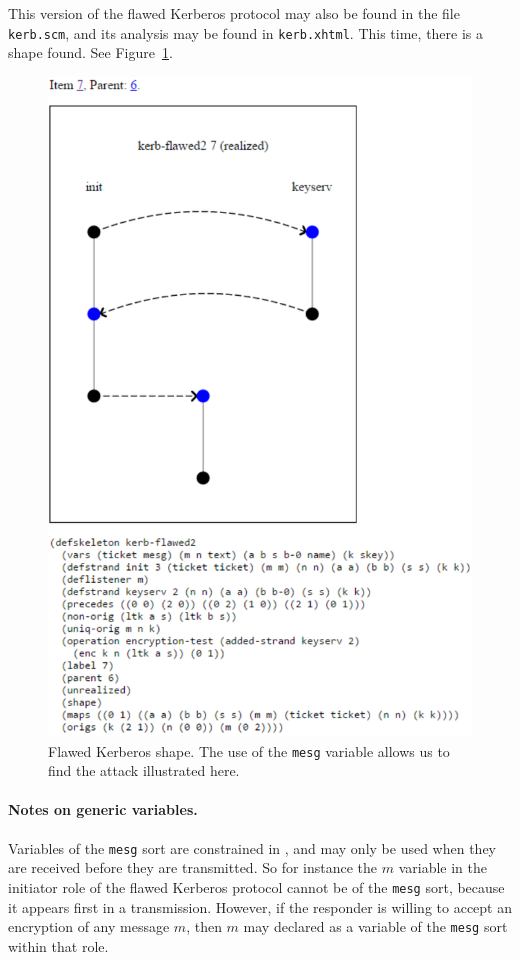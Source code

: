 This version of the flawed Kerberos protocol may also be found in the
file \texttt{kerb.scm}, and its analysis may be found in
\texttt{kerb.xhtml}.  This time, there is a shape found.  See
Figure~\ref{fig:kerb-skel7}.

\begin{figure}
\centering
\includegraphics[scale=0.8]{kerb_skel7}
\caption[Flawed Kerberos shape]{Flawed Kerberos shape.  The use of the \texttt{mesg} variable allows us to find the attack illustrated here.}
\label{fig:kerb-skel7}
\end{figure}

\paragraph{Notes on generic variables.}
Variables of the \texttt{mesg} sort are constrained in {\cpsa}, and
may only be used when they are received before they are transmitted.
So for instance the $m$ variable in the initiator role of the flawed
Kerberos protocol cannot be of the \texttt{mesg} sort, because it
appears first in a transmission. However, if the responder is willing
to accept an encryption of any message $m$, then $m$ may declared as a
variable of the \texttt{mesg} sort within that role.

